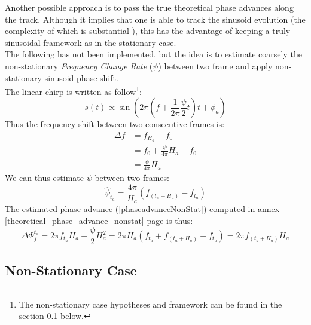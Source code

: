 \documentclass[]{article}
\begin{document}
Another possible approach is to pass the true theoretical phase advances along the track. Although it implies that one is able to track the sinusoid evolution (the complexity of which is substantial \cite{mcaulay1986speech, serra1989system, karrer2006phavorit}), this has the advantage of keeping a truly sinusoidal framework as in the stationary case.\\
The following has not been implemented, but the idea is to estimate coarsely the non-stationary \emph{Frequency Change Rate} ($\psi$) between two frame and apply non-stationary sinusoid phase shift.\\
The linear chirp is written as follow\footnote{The non-stationary case hypotheses and framework can be found in the section \ref{non-stationary-case} below.}:
\begin{equation}
s(t) \propto \sin\left(2\pi\left(f  + \frac{1}{2\pi}\frac{\psi}{2} t\right)t + \phi_a\right)
\end{equation}
Thus the frequency shift between two consecutive frames is:
\begin{equation}
\begin{split}
\Delta f & = f_{H_a} - f_0\\
& = f_0 + \frac{\psi}{4\pi}H_a - f_0\\
& = \frac{\psi}{4\pi}H_a
\end{split}
\end{equation}
We can thus estimate $\psi$ between two frames:
\begin{equation}
\hat{\psi}_{t_a} = \frac{4\pi}{H_a}\left(f_{(t_a + H_a)} - f_{t_a} \right)
\end{equation}
The estimated phase advance (\ref{phaseadvanceNonStat}) computed in annex \ref{theoretical_phase_advance_nonstat} page \pageref{theoretical_phase_advance_nonstat} is thus:
\begin{equation}
\Delta \Phi_{f}^{t_a} = 2\pi f_{t_a} H_a + \frac{\psi}{2}H_a^2 = 2\pi H_a\left(f_{t_a} + f_{(t_a + H_a)} - f_{t_a} \right) = 2\pi f_{(t_a + H_a)} H_a
\end{equation}

\subsection{Non-Stationary Case}\label{non-stationary-case}
\end{document}
